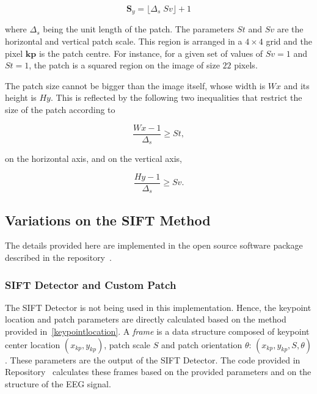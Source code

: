 \documentclass[review]{elsarticle}
\begin{document}
\begin{equation}
\mathbf{S}_y = \lfloor \Delta_s \; Sv \rfloor + 1
\label{eq:sy}
\end{equation}

\noindent where $\Delta_s$ being the unit length of the patch. The parameters $St$  and $Sv$ are the horizontal and vertical patch scale. This region is arranged in a $4 \times 4$ grid and the pixel $\mathbf{kp}$ is the patch centre.   For instance, for a given set of values of $Sv = 1$ and $St = 1$, the patch is a squared region on the image of size $22$ pixels.

The patch size cannot be bigger than the image itself, whose width is $Wx$ and its height is $Hy$.  This is reflected by the following two inequalities that restrict the size of the patch according to 

\begin{equation}
\frac{Wx-1}{\Delta_s}  \geq St ,
\label{eq:restriction1}
\end{equation}

\noindent on the horizontal axis, and on the vertical axis, 

\begin{equation}
\frac{Hy-1}{\Delta_s}  \geq Sv.
\label{eq:restriction2}
\end{equation}

\subsection{Variations on the SIFT Method}
\label{siftdetails}

The details provided here are implemented in the open source software package described in the repository~\cite{BciSift}.

\subsubsection{SIFT Detector and Custom Patch}

The SIFT Detector is not being used in this implementation.  Hence, the keypoint location and patch parameters are directly calculated based on the method provided in~\ref{keypointlocation}.  A \textit{frame} is a data structure composed of keypoint center location  $(x_{kp}, y_{kp})$, patch scale  $S$ and patch orientation $\theta$: $ ( x_{kp}, y_{kp}, S, \theta ) $. These parameters are the output of the SIFT Detector.  The code provided in Repository~\cite{BciSift} calculates these frames based on the provided parameters and on the structure of the EEG signal.
\end{document}
